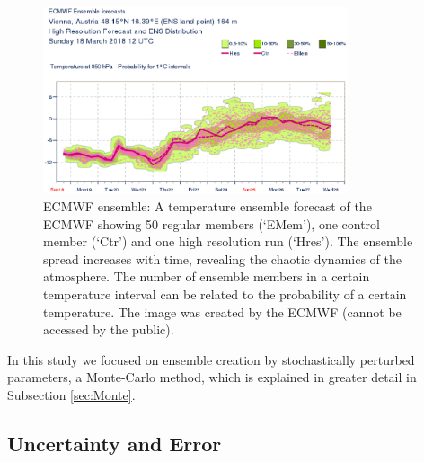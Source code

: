 \begin{figure}[H]
    \centering
    \includegraphics[width=0.8\textwidth]{graphics/ecwmfensemble_clip.eps}
    \caption[Example of Ensemble Forecast]{ECMWF ensemble: A temperature ensemble forecast of the ECMWF showing 50 regular members (`EMem'), one control member (`Ctr') and one high resolution run (`Hres'). The ensemble spread increases with time, revealing the chaotic dynamics of the atmosphere. The number of  ensemble members in a certain temperature interval can be related to the probability of a certain temperature. The image was created by the ECMWF (cannot be accessed by the public).}
    \label{fig:ecmwf_ensemble}
\end{figure}
In this study we focused on ensemble creation by stochastically perturbed parameters, a Monte-Carlo method, which is explained in greater detail in Subsection \ref{sec:Monte}.

\subsection{Uncertainty and Error}

